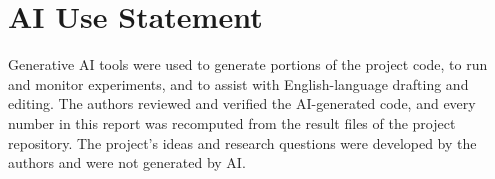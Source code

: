 \section*{AI Use Statement}
Generative AI tools were used to generate portions of the project code, to run and monitor experiments, and to assist
with English-language drafting and editing. The authors reviewed and verified the AI-generated code, and every number in
this report was recomputed from the result files of the project repository. The project's ideas and research questions
were developed by the authors and were not generated by AI.
